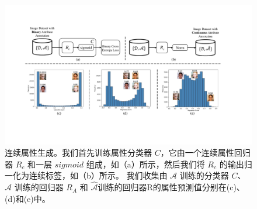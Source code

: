 \begin{figure}[!t]
  \centering
  \includegraphics[width=1.0\linewidth]{figures/ACGAN/continue.pdf}
  \caption{连续属性生成。我们首先训练属性分类器 $C$，它由一个连续属性回归器 $R_c$ 和一层 $sigmoid$ 组成，如（a）所示，然后我们将 $R_c$ 的输出归一化为连续标签，如（b）所示。 我们收集由 $\mathcal{A}$ 训练的分类器 $C$、$\mathcal{A}$ 训练的回归器 $R_A$ 和 $\hat{\mathcal{A}} 训练的回归器 $R$ 的属性预测值 $分别在(c)、(d)和(e)中。}
  \label{fig:quantization}
\end{figure}

